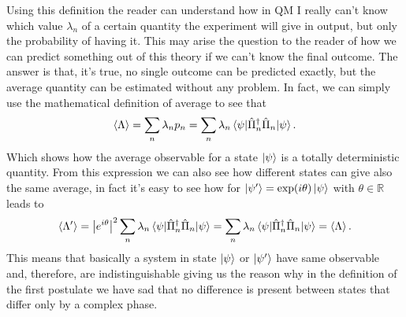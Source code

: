 Using this definition the reader can understand how in QM I really can't know which value $\lambda_n$ of a certain quantity the experiment will give in output, but only the probability of having it. This may arise the question to the reader of how we can predict something out of this theory if we can't know the final outcome. The answer is that, it's true, no single outcome can be predicted exactly, but the average quantity can be estimated without any problem. In fact, we can simply use the mathematical definition of average to see that
\begin{equation}
    \left\langle \Lambda \right\rangle = \sum_n \lambda_np_n = \sum_n \lambda_n\ev{\hat{\Pi}^\dagger_n\hat{\Pi}_n}{\psi}.
\end{equation}
Which shows how the average observable for a state $\ket{\psi}$ is a totally deterministic quantity. From this expression we can also see how different states can give also the same average, in fact it's easy to see how for $\ket{\psi'} = \exp(i\theta)\ket{\psi}$ with $\theta \in \mathbb{R}$ leads to
\begin{equation}
    \left\langle \Lambda' \right\rangle = \abs{e^{i\theta}}^2\sum_n \lambda_n\ev{\hat{\Pi}^\dagger_n\hat{\Pi}_n}{\psi} = \sum_n \lambda_n\ev{\hat{\Pi}^\dagger_n\hat{\Pi}_n}{\psi} = \left\langle \Lambda \right\rangle.
\end{equation}
This means that basically a system in state $\ket{\psi}$ or $\ket{\psi'}$ have same observable and, therefore, are indistinguishable giving us the reason why in the definition of the first postulate we have sad that no difference is present between states that differ only by a complex phase.